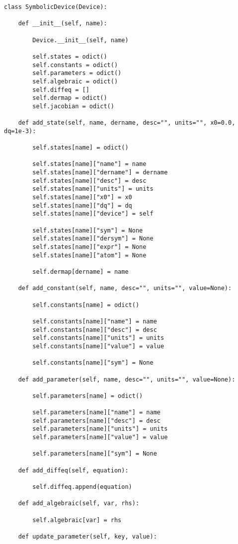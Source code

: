 \begin{lstlisting}
class SymbolicDevice(Device):

    def __init__(self, name):

        Device.__init__(self, name)

        self.states = odict()
        self.constants = odict()
        self.parameters = odict()
        self.algebraic = odict()
        self.diffeq = []
        self.dermap = odict()
        self.jacobian = odict()

    def add_state(self, name, dername, desc="", units="", x0=0.0, dq=1e-3):

        self.states[name] = odict()

        self.states[name]["name"] = name
        self.states[name]["dername"] = dername
        self.states[name]["desc"] = desc
        self.states[name]["units"] = units
        self.states[name]["x0"] = x0
        self.states[name]["dq"] = dq
        self.states[name]["device"] = self

        self.states[name]["sym"] = None
        self.states[name]["dersym"] = None
        self.states[name]["expr"] = None
        self.states[name]["atom"] = None

        self.dermap[dername] = name

    def add_constant(self, name, desc="", units="", value=None):

        self.constants[name] = odict()

        self.constants[name]["name"] = name
        self.constants[name]["desc"] = desc
        self.constants[name]["units"] = units
        self.constants[name]["value"] = value

        self.constants[name]["sym"] = None

    def add_parameter(self, name, desc="", units="", value=None):

        self.parameters[name] = odict()

        self.parameters[name]["name"] = name
        self.parameters[name]["desc"] = desc
        self.parameters[name]["units"] = units
        self.parameters[name]["value"] = value

        self.parameters[name]["sym"] = None

    def add_diffeq(self, equation):

        self.diffeq.append(equation)

    def add_algebraic(self, var, rhs):

        self.algebraic[var] = rhs

    def update_parameter(self, key, value):


\end{lstlisting}
